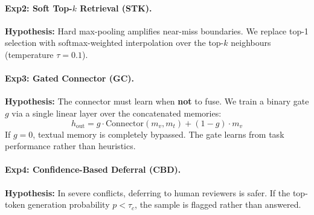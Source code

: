 \documentclass{article}
\begin{document}
\paragraph{Exp2: Soft Top-$k$ Retrieval (STK).}
\textbf{Hypothesis:} Hard max-pooling amplifies near-miss boundaries. We replace top-1 selection with softmax-weighted interpolation over the top-$k$ neighbours (temperature $\tau=0.1$).

\paragraph{Exp3: Gated Connector (GC).}
\textbf{Hypothesis:} The connector must learn when \textbf{not} to fuse. We train a binary gate $g$ via a single linear layer over the concatenated memories:
\begin{equation}
  h_\text{out} = g \cdot \text{Connector}(m_v, m_t) + (1-g) \cdot m_v
\end{equation}
If $g=0$, textual memory is completely bypassed. The gate learns from task performance rather than heuristics.

\paragraph{Exp4: Confidence-Based Deferral (CBD).}
\textbf{Hypothesis:} In severe conflicts, deferring to human reviewers is safer. If the top-token generation probability $p < \tau_c$, the sample is flagged rather than answered.



\newpage




\end{document}
